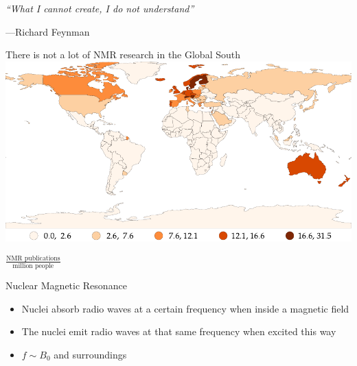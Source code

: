 \documentclass{ethpresentation}
\title{\Huge\magnethical}
\subtitle{Master Thesis: Building a 25\,MHz NMR Spectrometer}
\date{\today}
\author{Maximilian Stabel}
\institute{ETH Zürich}
\begin{document}
\maketitle %

\begin{frame}
    \centering
    \emph{\enquote{What I cannot create, I do not understand}}

    \vspace{\baselineskip}

    \hfill{}---Richard Feynman
\end{frame}

\begin{frame}{There is not a lot of NMR research in the Global South}
    \centering
    \includegraphics[height=0.8\textheight]{images/nmr-affiliations-per-million-people_naturalbreaks.pdf}

    \(\frac{\text{NMR publications}}{\text{million people}}\)
\end{frame}

\begin{frame}{Nuclear Magnetic Resonance}
    \begin{itemize}
        \item Nuclei absorb radio waves at a certain frequency when inside a magnetic field
        \item The nuclei emit radio waves at that same frequency when excited this way
        \item \(f \sim{} B_0\) and surroundings
    \end{itemize}
\end{frame}
\end{document}
